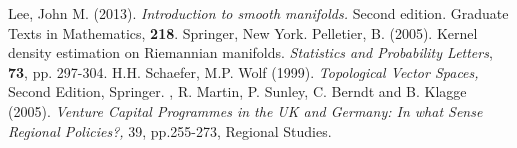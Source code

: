 \documentclass[a0,landscape]{a0poster}
\begin{document}
\begin{multicols}{4}
{\begin{thebibliography}{1}
      Lee, John M. (2013). {\em Introduction to smooth manifolds.} Second edition. Graduate Texts in Mathematics, {\bf 218}. Springer, New York.
%
 Pelletier, B. (2005). Kernel density estimation
on Riemannian manifolds. {\it Statistics and Probability Letters},
{\bf 73}, pp. 297-304.
%
  H.H. Schaefer, M.P. Wolf (1999). {\em Topological Vector Spaces,} Second Edition, Springer.
%
 , R. Martin, P. Sunley, C. Berndt and B. Klagge (2005). {\em Venture Capital Programmes in the UK and Germany: In what Sense Regional Policies?,} 39, pp.255-273, Regional Studies.
%

\end{thebibliography}

}






\end{multicols}
\end{document}
